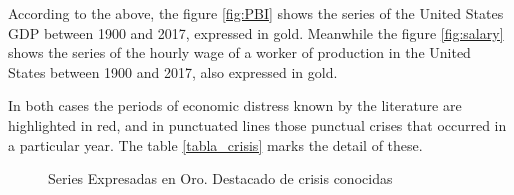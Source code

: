 \documentclass[a4paper]{article}
\begin{document}
According to the above, the figure \ref{fig:PBI} shows the series of the United States GDP between 1900 and 2017, expressed in gold. Meanwhile the figure \ref{fig:salary} shows the series of the hourly wage of a worker of production in the United States between 1900 and 2017, also expressed in gold.

In both cases the periods of economic distress known by the literature are highlighted in red, and in punctuated lines those punctual crises that occurred in a particular year. The table \ref{tabla_crisis} marks the detail of these.


\begin{figure}[H]
	\centering
	\caption{Series Expresadas en Oro. Destacado de crisis conocidas} \label{fig:series_crisis}
\end{figure}
\end{document}
